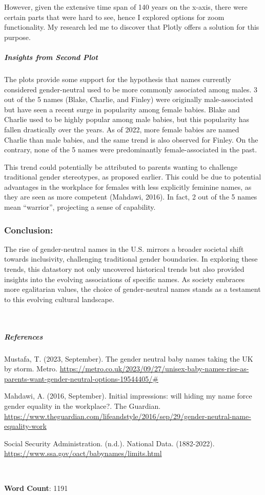 \documentclass[
]{article}
\begin{document}
However, given the extensive time span of 140 years on the x-axis, there
were certain parts that were hard to see, hence I explored options for
zoom functionality. My research led me to discover that Plotly offers a
solution for this purpose.

\hypertarget{insights-from-second-plot}{%
\subparagraph{\texorpdfstring{\textbf{Insights from Second
Plot}}{Insights from Second Plot}}\label{insights-from-second-plot}}

The plots provide some support for the hypothesis that names currently
considered gender-neutral used to be more commonly associated among
males. 3 out of the 5 names (Blake, Charlie, and Finley) were originally
male-associated but have seen a recent surge in popularity among female
babies. Blake and Charlie used to be highly popular among male babies,
but this popularity has fallen drastically over the years. As of 2022,
more female babies are named Charlie than male babies, and the same
trend is also observed for Finley. On the contrary, none of the 5 names
were predominantly female-associated in the past.

This trend could potentially be attributed to parents wanting to
challenge traditional gender stereotypes, as proposed earlier. This
could be due to potential advantages in the workplace for females with
less explicitly feminine names, as they are seen as more competent
(Mahdawi, 2016). In fact, 2 out of the 5 names mean ``warrior'',
projecting a sense of capability.

\hypertarget{conclusion}{%
\subsubsection{Conclusion:}\label{conclusion}}

The rise of gender-neutral names in the U.S. mirrors a broader societal
shift towards inclusivity, challenging traditional gender boundaries. In
exploring these trends, this datastory not only uncovered historical
trends but also provided insights into the evolving associations of
specific names. As society embraces more egalitarian values, the choice
of gender-neutral names stands as a testament to this evolving cultural
landscape.

~

\hypertarget{references}{%
\subparagraph{\texorpdfstring{\textbf{References}}{References}}\label{references}}

Mustafa, T. (2023, September). The gender neutral baby names taking the
UK by storm. Metro.
\url{https://metro.co.uk/2023/09/27/unisex-baby-names-rise-as-parents-want-gender-neutral-options-19544405/\#}

Mahdawi, A. (2016, September). Initial impressions: will hiding my name
force gender equality in the workplace?. The Guardian.
\url{https://www.theguardian.com/lifeandstyle/2016/sep/29/gender-neutral-name-equality-work}

Social Security Administration. (n.d.). National Data. (1882-2022).
\url{https://www.ssa.gov/oact/babynames/limits.html}

~

\textbf{Word Count}: 1191
\end{document}
